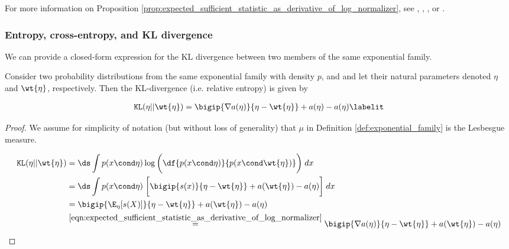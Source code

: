 \documentclass{article} %
\newcommand{\logNormalizerFunction}{a}
\newcommand{\sufficientStatsFunction}{s}
\newcommand{\naturalParam}{\eta}
\begin{document}
For more information on Proposition \ref{prop:expected_sufficient_statistic_as_derivative_of_log_normalizer}, see \citet{jordan2010exponential}, \citet{jordan2010conjugate}, \citet{nielsen2010entropies}, or \citet{nielsen2009statistical}.   

\subsubsection{Entropy, cross-entropy, and KL divergence}

We can provide a closed-form expression for the KL divergence between two members of the same exponential family. 

\begin{proposition}
Consider two probability distributions from the same exponential family with density $p$, and and let their natural  parameters denoted $\naturalParam$ and $\wt{\naturalParam}$, respectively.  Then the KL-divergence (i.e. relative entropy) is given by

\begin{align*}
\texttt{KL}(\naturalParam || \wt{\naturalParam}) = \bigip{\nabla \logNormalizerFunction(\naturalParam)}{\naturalParam - \wt{\naturalParam}} + \logNormalizerFunction(\naturalParam) - \logNormalizerFunction(\naturalParam) 
\labelit \label{eqn:KL_divergence_between_two_members_of_the_sample_exponential_family}
\end{align*}
 


\begin{proof}
We assume for simplicity of notation (but without loss of generality) that $\mu$ in Definition \ref{def:exponential_family} is the Lesbesgue measure. 

\begin{align*}
\texttt{KL}(\naturalParam || \wt{\naturalParam}) &= \ds\int p(x \cond \naturalParam) \log \bigg( \df{p(x \cond \naturalParam)}{p(x \cond \wt{\naturalParam})}\bigg) \;dx \\ 
& = \ds\int p(x \cond \naturalParam) \; \bigg[ \bigip{\sufficientStatsFunction(x)}{\naturalParam - \wt{\naturalParam}}  + \logNormalizerFunction(\wt{\naturalParam}) - \logNormalizerFunction(\naturalParam) \bigg] \; dx \\
&= \bigip{\E_{\naturalParam}[\sufficientStatsFunction(X)]}{\naturalParam - \wt{\naturalParam} } + \logNormalizerFunction(\wt{\naturalParam}) - \logNormalizerFunction(\naturalParam) \\
& \stackrel{\eqref{eqn:expected_sufficient_statistic_as_derivative_of_log_normalizer}}{=}  \bigip{\nabla \logNormalizerFunction(\naturalParam)}{\naturalParam - \wt{\naturalParam} } + \logNormalizerFunction(\wt{\naturalParam}) - \logNormalizerFunction(\naturalParam)
\end{align*}
	
\end{proof}
\label{prop:kl_divergence_between_members_of_same_exponential_family}
\end{proposition}
\end{document}
